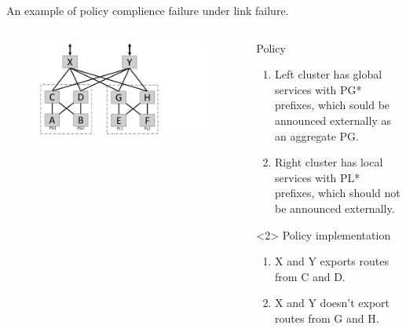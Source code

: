 \begin{frame}{An example of policy complience failure under link failure.}
    \begin{columns}
        \begin{column}{0.45\textwidth}
            \begin{figure}
                \includegraphics[width=1\textwidth,keepaspectratio,frame,clip,trim={0cm 0cm 9cm 0cm}]{figures/ex2_clean.pdf}
            \end{figure}
        \end{column}
        \begin{column}{0.50\textwidth}
            \begin{block}{Policy}
                \begin{enumerate}
                    \item Left cluster has global services with PG* prefixes, which sould be announced externally as an aggregate PG.
                    \item Right cluster has local services with PL* prefixes, which should not be announced externally.
                \end{enumerate}
            \end{block}
            \begin{block}<2>    {Policy implementation}
                \begin{enumerate}
                    \item X and Y exports routes from C and D.
                    \item X and Y doesn't export routes from G and H.
                \end{enumerate}
            \end{block}
        \end{column}
    \end{columns}
\end{frame}

